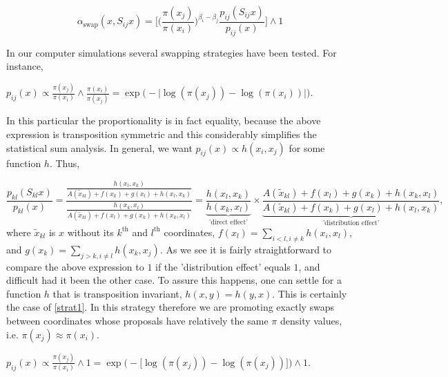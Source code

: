 \documentclass{article}
\begin{document}
\begin{equation*}
	\alpha_\text{swap}(x,S_{ij} x) = \Big[  \Big(\frac{\pi(x_j)}{\pi(x_i)} \Big)^{\beta_i - \beta_j}  \frac{ p_{ij}(S_{ij} x )}{ p_{ij}( x ) }\Big] \wedge 1
\end{equation*}	

In our computer simulations several swapping strategies have been tested. For instance,

\begin{strategy}
	\item 
		$
			p_{ij}(x) \propto 
			\frac{\pi (x_j)}{\pi( x_i )} \wedge \frac{\pi (x_i)}{\pi( x_j )} = 
			\exp \Big( - \big| \log ( \pi(x_j) ) - \log ( \pi(x_i) ) \big| \Big).
		$\label{strat1} 
\end{strategy}

In this particular the proportionality is in fact equality, because the above expression is transposition symmetric and this considerably simplifies the statistical sum analysis. In general, we want $p_{ij}(x) \propto h(x_i,x_j)$ for some function $h$. Thus,

\begin{equation*}
	\frac{p_{kl}(S_{kl}x)}{p_{kl}(x)} = \frac{\frac{h(x_l,x_k)}{A(\tilde{x}_{kl})+f(x_k)+g(x_l)+h(x_l,x_k)}}{
	\frac{h(x_k,x_l)}{A(\tilde{x}_{kl})+f(x_l)+g(x_k)+h(x_k,x_l)}
	} = 
	\underbrace{\frac{h(x_l,x_k)}{h(x_k,x_l)}}_\text{'direct effect'} 
	\times 
	\underbrace{\frac{A(\tilde{x}_{kl})+f(x_l)+g(x_k)+h(x_k,x_l)}{A(\tilde{x}_{kl})+f(x_k)+g(x_l)+h(x_l,x_k)}}_\text{'distribution effect'},	 	 	
\end{equation*}  
where $\tilde{x}_{kl}$ is $x$ without its $k^\text{th}$ and $l^\text{th}$ coordinates, $f(x_l) = \sum_{i<l, i\not=k} h(x_i, x_l)$, and $g(x_k) = \sum_{j>k, i\not=l}h(x_k, x_j)$. As we see it is fairly straightforward to compare the above expression to $1$ if the 'distribution effect' equals $1$, and difficult had it been the other case. To assure this happens, one can settle for a function $h$ that is transposition invariant, $h(x,y)=h(y,x)$. This is certainly the case of \ref{strat1}. In this strategy therefore we are promoting exactly swaps between coordinates whose proposals have relatively the same $\pi$ density values, i.e. $\pi (x_j) \approx \pi (x_i)$. 



\begin{strategy}[resume]
	\item 
		$
			p_{ij}(x) \propto 
			\frac{\pi (x_j)}{\pi (x_i)} \wedge 1 = 
			\exp \Big( - \big[ \log ( \pi(x_j) ) - \log ( \pi(x_j) ) \big]\Big) \wedge 1.$\label{strat2}
\end{strategy}
\end{document}
